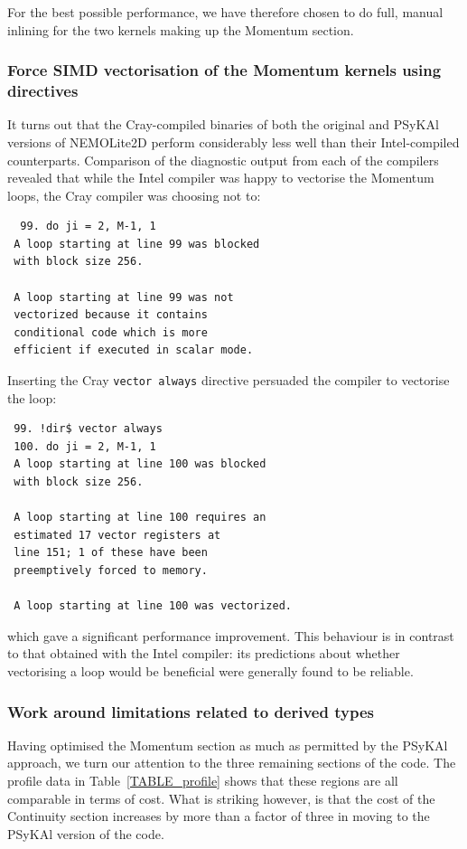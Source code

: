 \documentclass[gmdd, manuscript]{copernicus}
\begin{document}
For the best possible performance, we have therefore chosen to do full, manual
inlining for the two kernels making up the Momentum section.

\subsubsection{Force SIMD vectorisation of the Momentum kernels 
 using directives}

It turns out that the Cray-compiled binaries of both the original and
{PS}y{KA}l versions of NEMOLite2D perform considerably less well than
their Intel-compiled counterparts. Comparison of the diagnostic output
from each of the compilers revealed that while the Intel compiler was
happy to vectorise the Momentum loops, the Cray compiler was choosing
not to:
\begin{verbatim}
  99. do ji = 2, M-1, 1
 A loop starting at line 99 was blocked 
 with block size 256.

 A loop starting at line 99 was not
 vectorized because it contains 
 conditional code which is more
 efficient if executed in scalar mode.
\end{verbatim}
Inserting the Cray \texttt{vector always} directive persuaded the compiler
to vectorise the loop:
\begin{verbatim}
 99. !dir$ vector always
 100. do ji = 2, M-1, 1
 A loop starting at line 100 was blocked
 with block size 256.

 A loop starting at line 100 requires an 
 estimated 17 vector registers at 
 line 151; 1 of these have been 
 preemptively forced to memory.

 A loop starting at line 100 was vectorized.
\end{verbatim}
which gave a significant performance improvement. This behaviour is in
contrast to that obtained with the Intel compiler: its predictions
about whether vectorising a loop would be beneficial were generally
found to be reliable.

\subsubsection{Work around limitations related to derived types}

Having optimised the Momentum section as much as permitted by the
{PS}y{KA}l approach, we turn our attention to the three remaining
sections of the code. The profile data in Table~\ref{TABLE_profile}
shows that these regions are all comparable in terms of cost. What is
striking however, is that the cost of the Continuity section increases
by more than a factor of three in moving to the {PS}y{KA}l version of the
code.
\end{document}
